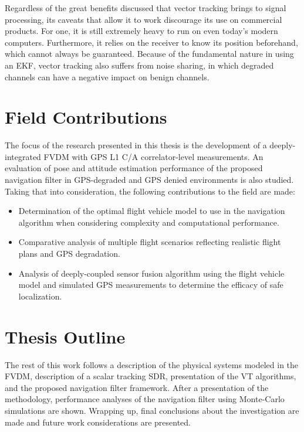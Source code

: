 Regardless of the great benefits discussed that vector tracking brings to signal processing, its caveats that allow it to work discourage its use on commercial products. For one, it is still extremely heavy to run on even today's modern computers. Furthermore, it relies on the receiver to know its position beforehand, which cannot always be guaranteed. Because of the fundamental nature in using an EKF, vector tracking also suffers from noise sharing, in which degraded channels can have a negative impact on benign channels.

\section{\textbf{Field Contributions}}
The focus of the research presented in this thesis is the development of a deeply-integrated FVDM with GPS L1 C/A correlator-level measurements. An evaluation of pose and attitude estimation performance of the proposed navigation filter in GPS-degraded and GPS denied environments is also studied. Taking that into consideration, the following contributions to the field are made:
\begin{itemize}
    \item Determination of the optimal flight vehicle model to use in the navigation algorithm when considering complexity and computational performance.
    \item Comparative analysis of multiple flight scenarios reflecting realistic flight plans and GPS degradation.
    \item Analysis of deeply-coupled sensor fusion algorithm using the flight vehicle model and simulated GPS measurements to determine the efficacy of safe localization.
\end{itemize}

\section{\textbf{Thesis Outline}}
The rest of this work follows a description of the physical systems modeled in the FVDM, description of a scalar tracking SDR, presentation of the VT algorithms, and the proposed navigation filter framework. After a presentation of the methodology, performance analyses of the navigation filter using Monte-Carlo simulations are shown. Wrapping up, final conclusions about the investigation are made and future work considerations are presented.